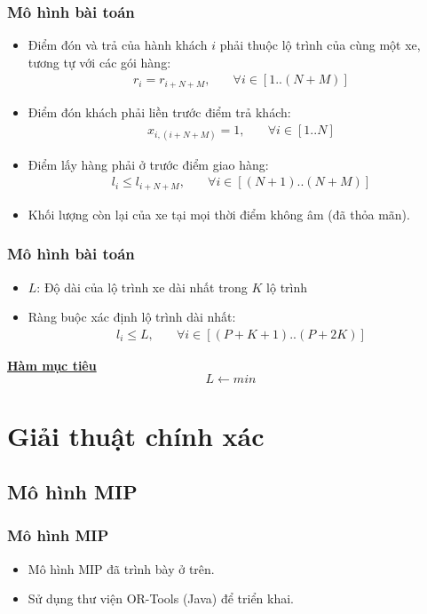 \documentclass{beamer}
\begin{document}
	\begin{frame}
		\frametitle{Mô hình bài toán}
		\begin{itemize}
			\item Điểm đón và trả của hành khách $i$ phải thuộc lộ trình của cùng một xe, tương tự với các gói hàng:
				\begin{align}
				r_i = r_{i+N+M},\quad & \forall i\in [1..(N+M)]
				\end{align}
			\item Điểm đón khách phải liền trước điểm trả khách:
				\begin{align}
				x_{i,(i+N+M)} = 1,\quad & \forall i\in [1..N]
				\end{align}
			\item Điểm lấy hàng phải ở trước điểm giao hàng:
				\begin{align}
				l_i \leq l_{i+N+M},\quad & \forall i\in [(N+1)..(N+M)]
				\end{align}
			\item Khối lượng còn lại của xe tại mọi thời điểm không âm (đã thỏa mãn).
		\end{itemize}
	\end{frame}

	\begin{frame}
		\frametitle{Mô hình bài toán}
		\begin{itemize}
			\item $L$: Độ dài của lộ trình xe dài nhất trong $K$ lộ trình
			\item Ràng buộc xác định lộ trình dài nhất:
				\begin{align}
				l_i\leq L,\quad & \forall i\in [(P+K+1)..(P+2K)]
				\end{align}
		\end{itemize}
		\textbf{\underline{Hàm mục tiêu}}
			\begin{equation}
			L \leftarrow min
			\end{equation}
	\end{frame}

	
	\section{Giải thuật chính xác}
	
	
	\subsection{Mô hình MIP}
	\begin{frame}
		\frametitle{Mô hình MIP}
		\begin{itemize}
			\item Mô hình MIP đã trình bày ở trên.
			\item Sử dụng thư viện OR-Tools (Java) để triển khai.
		\end{itemize}
	\end{frame}
\end{document}
